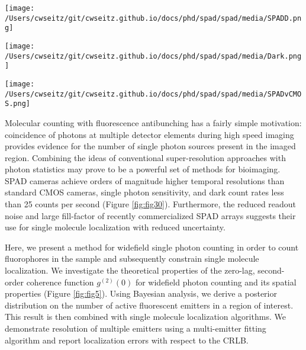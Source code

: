 \begin{figure*}[t]
\centering
\texttt{[image: /Users/cwseitz/git/cwseitz.github.io/docs/phd/spad/spad/media/SPADD.png]}
\caption{\textbf{Experimental setup for widefield photon counting}. (left) A 532nm pulsed laser is directed through filtering and focusing optics to a 100X oil-immersion objective. Emisson light is collected by a CMOS or SPAD sensor. (right) Diagram of the diode at each pixel of the SPAD array. Sensor micrograph courtesy of Pi Imaging Technologies}
\label{fig:fig00}
\end{figure*}    


\begin{figure*}[t]
\centering
\texttt{[image: /Users/cwseitz/git/cwseitz.github.io/docs/phd/spad/spad/media/Dark.png]}
\caption{\textbf{Dark counts of the SPAD array}. (left) Average pixel-wise dark counts for a 100x100 pixel region exposed for 100ms (right) Variance of dark counts for 100ms exposure.}
\label{fig:fig30}
\end{figure*}    


\begin{figure*}[t]
\centering
\texttt{[image: /Users/cwseitz/git/cwseitz.github.io/docs/phd/spad/spad/media/SPADvCMOS.png]}
\caption{\textbf{Comparison of quantum dot images between CMOS and SPAD cameras}. (left) SPAD image of Qdot655 coated on a glass coverslip using a 100X/1.4NA oil-immersion objective (Nikon) and a 10ms exposure time. (right) CMOS image of Qdot655 using a 60X/1.4NA oil-immersion objective (Olympus) and a 10ms exposure time. Both use continuous-wave 640nm excitation}
\label{fig:fig4}
\end{figure*}    

Molecular counting with fluorescence antibunching has a fairly simple motivation: coincidence of photons at multiple detector elements during high speed imaging provides evidence for the number of single photon sources present in the imaged region. Combining the ideas of conventional super-resolution approaches with photon statistics may prove to be a powerful set of methods for bioimaging. SPAD cameras achieve orders of magnitude higher temporal resolutions than standard CMOS cameras, single photon sensitivity, and dark count rates less than 25 counts per second (Figure \ref{fig:fig30}). Furthermore, the reduced readout noise and large fill-factor of recently commercialized SPAD arrays suggests their use for single molecule localization with reduced uncertainty.

Here, we present a method for widefield single photon counting in order to count fluorophores in the sample and subsequently constrain single molecule localization. We investigate the theoretical properties of the zero-lag, second-order coherence function $g^{(2)}(0)$ for widefield photon counting and its spatial properties (Figure \ref{fig:fig5}). Using Bayesian analysis, we derive a posterior distribution on the number of active fluorescent emitters in a region of interest. This result is then combined with single molecule localization algorithms.  We demonstrate resolution of multiple emitters using a multi-emitter fitting algorithm and report localization errors with respect to the CRLB.


